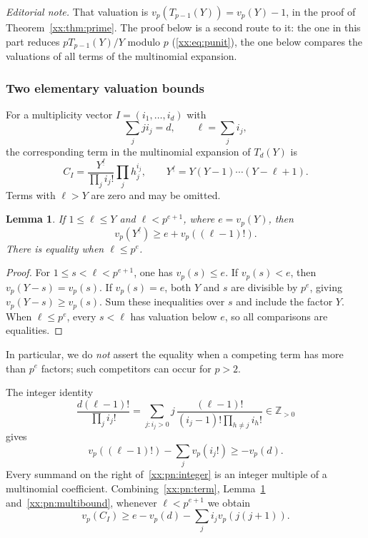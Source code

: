 \documentclass[11pt,a4paper]{article}
\numberwithin{equation}{section}
\newtheorem{lemma}[theorem]{Lemma}
\theoremstyle{definition}
\theoremstyle{remark}
\theoremstyle{plain}
\newcommand{\Z}{\mathbb Z}
\newcommand{\fall}[2]{#1^{\underline{#2}}}
\begin{document}
\emph{Editorial note.}  That valuation is $v_p(T_{p-1}(Y))=v_p(Y)-1$, in the
proof of Theorem~\ref{xx:thm:prime}.  The proof below is a second route to it:
the one in this part reduces $pT_{p-1}(Y)/Y$ modulo $p$
(\eqref{xx:eq:punit}), the one below compares the valuations of all terms of
the multinomial expansion.

\subsubsection{Two elementary valuation bounds}

For a multiplicity vector $I=(i_1,\ldots,i_d)$ with
\[
 \sum_jji_j=d,\qquad \ell=\sum_ji_j,
\]
the corresponding term in the multinomial expansion of $T_d(Y)$ is
\begin{equation}\label{xx:pn:term}
 C_I=\frac{\fall Y\ell}{\prod_ji_j!}\prod_jh_j^{i_j},
 \qquad \fall Y\ell=Y(Y-1)\cdots(Y-\ell+1).
\end{equation}
Terms with $\ell>Y$ are zero and may be omitted.

\begin{lemma}\label{xx:pn:falling}
If $1\le\ell\le Y$ and $\ell<p^{e+1}$, where $e=v_p(Y)$, then
\begin{equation}\label{xx:pn:fallingbound}
 v_p(\fall Y\ell)\ge e+v_p((\ell-1)!).
\end{equation}
There is equality when $\ell\le p^e$.
\end{lemma}
\begin{proof}
For $1\le s<\ell<p^{e+1}$, one has $v_p(s)\le e$. If $v_p(s)<e$, then
$v_p(Y-s)=v_p(s)$. If $v_p(s)=e$, both $Y$ and $s$ are divisible by $p^e$,
giving $v_p(Y-s)\ge v_p(s)$. Sum these inequalities over $s$ and include the
factor $Y$. When $\ell\le p^e$, every $s<\ell$ has valuation below $e$, so all
comparisons are equalities.
\end{proof}

In particular, we do \emph{not} assert the equality when a competing term has
more than $p^e$ factors; such competitors can occur for $p>2$.

The integer identity
\begin{equation}\label{xx:pn:integer}
 \frac{d(\ell-1)!}{\prod_ji_j!}
 =\sum_{j:i_j>0}j\,
 \frac{(\ell-1)!}{(i_j-1)!\prod_{h\ne j}i_h!}
 \in\Z_{>0}
\end{equation}
gives
\begin{equation}\label{xx:pn:multibound}
 v_p((\ell-1)!)-\sum_jv_p(i_j!)\ge-v_p(d).
\end{equation}
Every summand on the right of~\eqref{xx:pn:integer} is an integer multiple of a
multinomial coefficient. Combining~\eqref{xx:pn:term},
Lemma~\ref{xx:pn:falling} and~\eqref{xx:pn:multibound}, whenever
$\ell<p^{e+1}$ we obtain
\begin{equation}\label{xx:pn:master}
 v_p(C_I)\ge e-v_p(d)-\sum_ji_jv_p(j(j+1)).
\end{equation}
\end{document}
